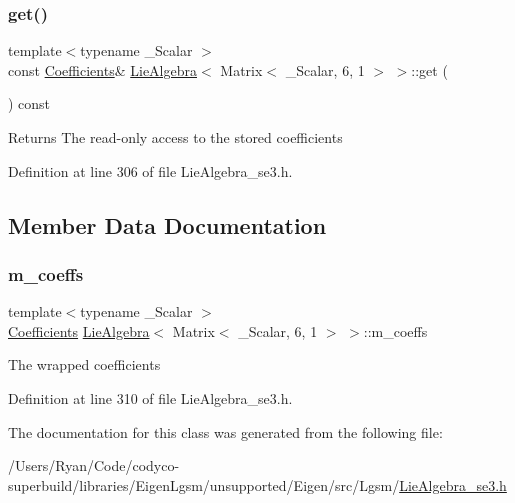 \subsubsection{\texorpdfstring{get()}{get()}\hspace{0.1cm}{\footnotesize\ttfamily [2/2]}}
{\footnotesize\ttfamily template$<$typename \+\_\+\+Scalar $>$ \\
const \hyperlink{class_lie_algebra_3_01_matrix_3_01___scalar_00_016_00_011_01_4_01_4_a2eb9bb9a54a2c7ce0b75b46814ea390e}{Coefficients}\& \hyperlink{class_lie_algebra}{Lie\+Algebra}$<$ Matrix$<$ \+\_\+\+Scalar, 6, 1 $>$ $>$\+::get (\begin{DoxyParamCaption}{ }\end{DoxyParamCaption}) const\hspace{0.3cm}{\ttfamily [inline]}}

\begin{DoxyReturn}{Returns}
The read-\/only access to the stored coefficients 
\end{DoxyReturn}


Definition at line 306 of file Lie\+Algebra\+\_\+se3.\+h.



\subsection{Member Data Documentation}
\hypertarget{class_lie_algebra_3_01_matrix_3_01___scalar_00_016_00_011_01_4_01_4_ae8bf705677cc037b0f98ca402025389f}{}\label{class_lie_algebra_3_01_matrix_3_01___scalar_00_016_00_011_01_4_01_4_ae8bf705677cc037b0f98ca402025389f} 
\subsubsection{\texorpdfstring{m\+\_\+coeffs}{m\_coeffs}}
{\footnotesize\ttfamily template$<$typename \+\_\+\+Scalar $>$ \\
\hyperlink{class_lie_algebra_3_01_matrix_3_01___scalar_00_016_00_011_01_4_01_4_a2eb9bb9a54a2c7ce0b75b46814ea390e}{Coefficients} \hyperlink{class_lie_algebra}{Lie\+Algebra}$<$ Matrix$<$ \+\_\+\+Scalar, 6, 1 $>$ $>$\+::m\+\_\+coeffs\hspace{0.3cm}{\ttfamily [protected]}}

The wrapped coefficients 

Definition at line 310 of file Lie\+Algebra\+\_\+se3.\+h.



The documentation for this class was generated from the following file\+:\begin{DoxyCompactItemize}
\item 
/\+Users/\+Ryan/\+Code/codyco-\/superbuild/libraries/\+Eigen\+Lgsm/unsupported/\+Eigen/src/\+Lgsm/\hyperlink{_lie_algebra__se3_8h}{Lie\+Algebra\+\_\+se3.\+h}\end{DoxyCompactItemize}
